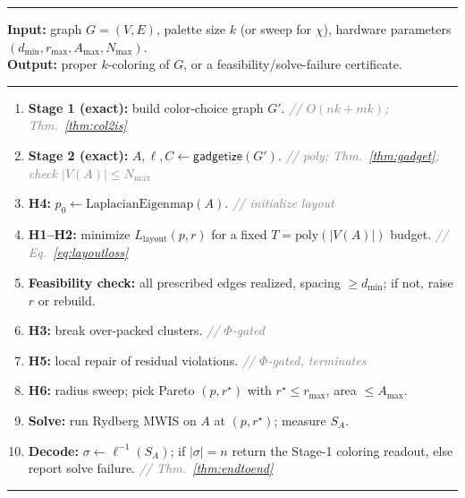 \documentclass[11pt]{article}
\theoremstyle{definition}
\theoremstyle{remark}
\newcommand{\Comment}[1]{\hfill\textit{\footnotesize\textcolor{gray}{// #1}}}
\begin{document}
\begin{algorithm}[h]
\caption{Certified coloring-to-neutral-atom compiler}
\label{alg:pipeline}
\rule{\linewidth}{0.4pt}\vspace{-2pt}
\begin{flushleft}
\textbf{Input:} graph $G=(V,E)$, palette size $k$ (or sweep for $\chi$), hardware
parameters $(d_{\min},r_{\max},A_{\max},N_{\max})$.\\
\textbf{Output:} proper $k$-coloring of $G$, or a feasibility/solve-failure certificate.
\end{flushleft}
\vspace{-4pt}\rule{\linewidth}{0.4pt}
\begin{enumerate}[leftmargin=2.4em,itemsep=1pt,label=\arabic*.]
\item \textbf{Stage 1 (exact):} build color-choice graph $G'$.
      \Comment{$O(nk+mk)$; Thm.~\ref{thm:col2is}}
\item \textbf{Stage 2 (exact):} $A,\ell,C \gets \mathsf{gadgetize}(G')$.
      \Comment{poly; Thm.~\ref{thm:gadget}; check $|V(A)|\le N_{\max}$}
\item \textbf{H4:} $p_0 \gets \mathrm{LaplacianEigenmap}(A)$.
      \Comment{initialize layout}
\item \textbf{H1--H2:} minimize $L_{\mathrm{layout}}(p,r)$ for a fixed
      $T=\mathrm{poly}(|V(A)|)$ budget. \Comment{Eq.~\eqref{eq:layoutloss}}
\item \textbf{Feasibility check:} all prescribed edges realized, spacing
      $\ge d_{\min}$; if not, raise $r$ or rebuild.
\item \textbf{H3:} break over-packed clusters. \Comment{$\Phi$-gated}
\item \textbf{H5:} local repair of residual violations.
      \Comment{$\Phi$-gated, terminates}
\item \textbf{H6:} radius sweep; pick Pareto $(p,r^\star)$ with
      $r^\star\le r_{\max}$, area $\le A_{\max}$.
\item \textbf{Solve:} run Rydberg MWIS on $A$ at $(p,r^\star)$; measure $S_A$.
\item \textbf{Decode:} $\sigma\gets\ell^{-1}(S_A)$; if $|\sigma|=n$ return the
      Stage-1 coloring readout, else report solve failure.
      \Comment{Thm.~\ref{thm:endtoend}}
\end{enumerate}
\vspace{-4pt}\rule{\linewidth}{0.4pt}
\end{algorithm}
\end{document}
